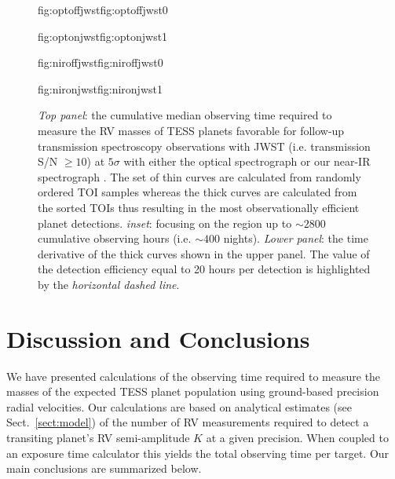 \begin{figure}
  \centering
  \hspace{-\hsize}%
  \begin{ocg}{fig:optoffjwst}{fig:optoffjwst}{0}%
  \end{ocg}%
  \begin{ocg}{fig:optonjwst}{fig:optonjwst}{1}%
  \end{ocg}
  \hspace{-\hsize}%
  \begin{ocg}{fig:niroffjwst}{fig:niroffjwst}{0}%
  \end{ocg}%
  \begin{ocg}{fig:nironjwst}{fig:nironjwst}{1}%
  \end{ocg}
  \hspace{-\hsize}%
  \caption{\emph{Top panel}: the cumulative median observing time required to measure the
    RV masses of TESS planets favorable for follow-up transmission spectroscopy observations with
    JWST (i.e. transmission S/N $\geq 10$) at $5\sigma$ with either the optical spectrograph
     or our
    near-IR spectrograph 
    . The set of 
    thin curves are calculated from randomly ordered TOI samples whereas the thick curves are
    calculated from the sorted TOIs thus resulting in the most observationally efficient planet
    detections. \emph{inset}: focusing on the region up to $\sim 2800$ cumulative observing hours
    (i.e. $\sim 400$ nights).
    \emph{Lower panel}: the time derivative of the thick curves shown in the upper panel.
    The value of the detection efficiency equal to 20 hours per detection is highlighted
    by the \emph{horizontal dashed line}.}
  \label{fig:trans}
\end{figure}


\section{Discussion and Conclusions} \label{sect:disc}
We have presented calculations of the observing time required to measure the masses of the
expected TESS planet population using ground-based precision radial velocities. Our calculations
are based on analytical estimates (see Sect.~\ref{sect:model})
of the number of RV measurements required to detect a transiting
planet's RV semi-amplitude $K$ at a given precision. When coupled to an exposure time calculator this
yields the total observing time per target. Our main conclusions are summarized below.

